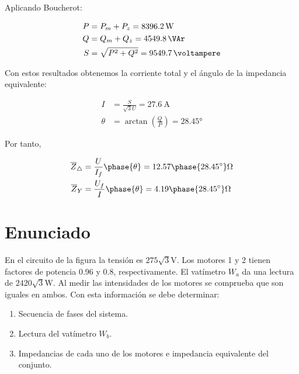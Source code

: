 \begin{enumerate}
  Aplicando Boucherot:

  \begin{align*}
    P &= P_m + P_z = \qty{8396.2}{\watt}\\
    Q &= Q_m + Q_z = \qty{4549.8}{\VAr}\\
    S & = \sqrt{P^2 + Q^2} = \qty{9549.7}{\voltampere}
  \end{align*}

  Con estos resultados obtenemos la corriente total y el ángulo de la impedancia equivalente:

  \begin{align*}
    I &= \frac{S}{\sqrt{3} U} = \qty{27.6}{\ampere}\\
    \theta &= \arctan(\frac{Q}{P}) = \ang{28.45}
  \end{align*}

  Por tanto,

  \begin{align*}
    \overline{Z}_{\triangle} &= \frac{U}{I_{f}}\phase{\theta} = 12.57\phase{\ang{28.45}}\unit{\ohm}\\
    \overline{Z}_{Y} &= \frac{U_f}{I}\phase{\theta} = 4.19\phase{\ang{28.45}}\unit{\ohm}
  \end{align*}
\end{enumerate}

\section{Enunciado}

En el circuito de la figura la tensión es $275\sqrt{3}\unit{\volt}$. Los motores 1 y 2 tienen factores de potencia 0.96 y 0.8, respectivamente. El vatímetro $W_a$ da una lectura de $2420\sqrt{3}\unit{\watt}$. Al medir las intensidades de los motores se comprueba que son iguales en ambos. Con esta información se debe determinar:

\begin{enumerate}
\item Secuencia de fases del sistema.
\item Lectura del vatímetro $W_b$.
\item Impedancias de cada uno de los motores e impedancia equivalente del conjunto.
\end{enumerate}

